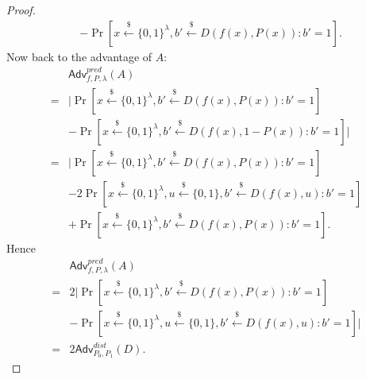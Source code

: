 \documentclass[12pt]{article}
\newcommand{\bits}{\{0,1\}}
\newcommand{\getsr}{\stackrel{\$}{\gets}}
\newcommand{\Adv}{\textsf{Adv}}
\theoremstyle{definition}
\begin{document}
\begin{proof}
$$\begin{aligned}
&-\Pr[x\getsr\bits^\lambda, b'\getsr D(f(x),P(x)): b'=1].
\end{aligned}$$
Now back to the advantage of $A$:
$$\begin{aligned}
&\Adv_{f,P,\lambda}^{pred}(A) \\
=& \bigg| \Pr[x\getsr\bits^\lambda, b'\getsr D(f(x),P(x)): b'=1] \\
&- \Pr[x\getsr\bits^\lambda, b'\getsr D(f(x),1-P(x)): b'=1] \bigg| \\
=& \bigg| \Pr[x\getsr\bits^\lambda, b'\getsr D(f(x),P(x)): b'=1] \\
&- 2\Pr[x\getsr\bits^\lambda, u\getsr\bits, b'\getsr D(f(x),u): b'=1]\\
&+\Pr[x\getsr\bits^\lambda, b'\getsr D(f(x),P(x)): b'=1].
\end{aligned}$$
Hence
$$\begin{aligned}
&\Adv_{f,P,\lambda}^{pred}(A) \\
=& 2\bigg| \Pr[x\getsr\bits^\lambda, b'\getsr D(f(x),P(x)): b'=1] \\
&-\Pr[x\getsr\bits^\lambda, u\getsr\bits, b'\getsr D(f(x),u): b'=1] \bigg| \\
=& 2\Adv_{P_0,P_1}^{dist}(D).
\end{aligned}$$

\end{proof}
\end{document}
